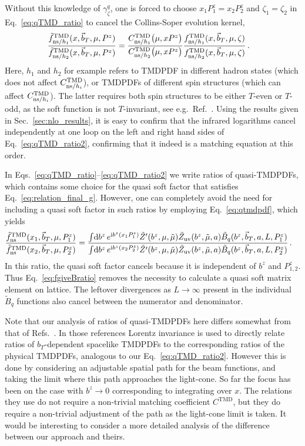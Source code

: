 \documentclass[11pt,a4paper]{article}
\DeclareRobustCommand{\eq}[1]{Eq.~\eqref{eq:#1}}
\DeclareRobustCommand{\sec}[1]{Sec.~\ref{sec:#1}}
\DeclareRobustCommand{\mycite}[1]{Ref.~\cite{#1}}
\DeclareRobustCommand{\mycites}[1]{Refs.~\cite{#1}}
\newcommand{\df}{\mathrm{d}}
\newcommand{\img}{\mathrm{i}}
\newcommand\TMD{\mathrm{TMD}}
\newcommand{\bt}{\vec b_T}
\newcommand{\ns}{{\rm ns}}
\begin{document}
Without this knowledge of $\gamma_\zeta^q$, one is forced to choose $x_1 P_1^z = x_2 P_2^z$ and $\zeta_1 = \zeta_2$ in \eq{qTMD_ratio} to cancel the Collins-Soper evolution kernel,
\begin{align} \label{eq:qTMD_ratio2}
 \frac{\tilde f_{\ns/h_1}^\TMD(x, \bt, \mu, P^z)}{\tilde f_{\ns/h_2}^\TMD(x, \bt, \mu, P^z)}
 &= \frac{C^\TMD_{\ns/h_1}\bigl(\mu, x P^z\bigr)}{C^\TMD_{\ns/h_2}\bigl(\mu, x P^z\bigr)}
   \frac{f^\TMD_{\ns/h_1}(x, \bt, \mu, \zeta)}{f^\TMD_{\ns/h_2}(x, \bt, \mu, \zeta)}
\,.\end{align}
Here, $h_1$ and $h_2$ for example refers to TMDPDF in different hadron states (which does not affect $C^\TMD_{\ns/h_i}$), or TMDPDFs of different spin structures (which can affect $C^\TMD_{\ns/h_i}$).
The latter requires both spin structures to be either $T$-even or $T$-odd, as the soft function is not $T$-invariant, see e.g.\ \mycite{Collins:1350496}. 
Using the results given in \sec{nlo_results}, it is easy to confirm that the infrared logarithms cancel independently at one loop on the left and right hand sides of \eq{qTMD_ratio2}, confirming that it indeed is a matching equation at this order.


In Eqs.\ \eqref{eq:qTMD_ratio}--\eqref{eq:qTMD_ratio2} we write ratios of quasi-TMDPDFs, which contains some choice for the quasi soft factor that satisfies \eq{relation_final_g}.
However, one can completely avoid the need for including a quasi soft factor in such ratios by employing \eq{qtmdpdf}, which yields
\begin{align} \label{eq:fgiveBratio}
 \frac{\tilde f_\ns^\TMD(x_1, \bt, \mu, P_1^z)}{\tilde f_\ns^\TMD(x_2, \bt, \mu, P_2^z)} &
 = \frac{\int\!\df b^z \, e^{\img b^z (x_1 P_1^z)} \tilde Z'(b^z,\mu,\tilde \mu) \tilde Z_{\rm uv}(b^z,\tilde \mu, a)
 \tilde B_{q}(b^z, \bt, a, L, P_1^z)}
        {\int\!\df b^z \, e^{\img b^z (x_2 P_2^z)} \tilde Z'(b^z,\mu,\tilde \mu) \tilde Z_{\rm uv}(b^z,\tilde \mu, a)
 \tilde B_{q}(b^z, \bt, a, L, P_2^z)}
\,.\end{align}
In this ratio, the quasi soft factor cancels because it is independent of $b^z$ and $P_{1,2}^z$. Thus \eq{fgiveBratio}
removes the necessity to calculate a quasi soft matrix element on lattice.
The leftover divergences as $L\to\infty$ present in the individual $\tilde B_q$ functions also cancel between the numerator and denominator.

Note that our analysis of ratios of quasi-TMDPDFs here differs somewhat from that of \mycites{Engelhardt:2015xja,Yoon:2016dyh,Yoon:2017qzo}. In those references Lorentz invariance is used to directly relate ratios of $b_T$-dependent spacelike TMDPDFs to the corresponding ratios of the physical TMDPDFs, analogous to our \eq{qTMD_ratio2}. However this is done by considering an adjustable spatial path for the beam functions, and taking the limit where this path approaches the light-cone. So far the focus has been on the case with $b^z\to 0$ corresponding to integrating over $x$. The relations they use do not require a non-trivial matching coefficient $C^\TMD$, but they do require a non-trivial adjustment of the path as the light-cone limit is taken. It would be interesting to consider a more detailed analysis of the difference between our approach and theirs.
\end{document}
